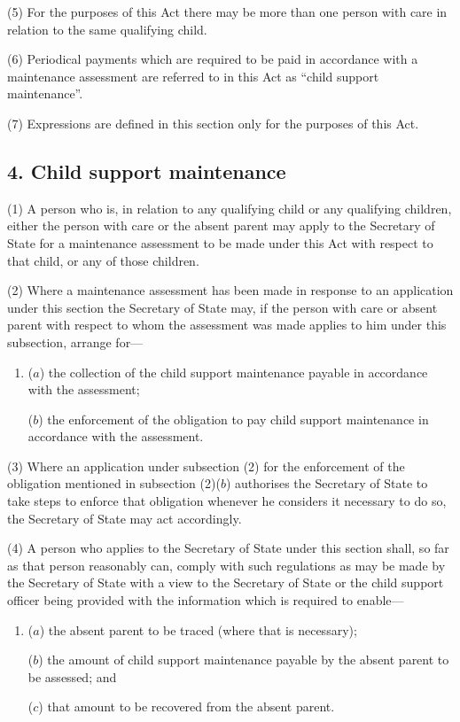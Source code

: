 \documentclass[12pt,a4paper]{article}
\begin{document}
(5) For the purposes of this Act there may be more than one person with care in relation to the same qualifying child.

(6) Periodical payments which are required to be paid in accordance with a maintenance assessment are referred to in this Act as “child support maintenance”.

(7) Expressions are defined in this section only for the purposes of this Act.


\subsection{4. Child support maintenance}

(1) A person who is, in relation to any qualifying child or any qualifying children, either the person with care or the absent parent may apply to the Secretary of State for a maintenance assessment to be made under this Act with respect to that child, or any of those children.

(2) Where a maintenance assessment has been made in response to an application under this section the Secretary of State may, if the person with care or absent parent with respect to whom the assessment was made applies to him under this subsection, arrange for—
\begin{enumerate}\item[]
($a$) the collection of the child support maintenance payable in accordance with the assessment;

($b$) the enforcement of the obligation to pay child support maintenance in accordance with the assessment.
\end{enumerate}

(3) Where an application under subsection (2)  for the enforcement of the obligation mentioned in subsection (2)($b$)  authorises the Secretary of State to take steps to enforce that obligation whenever he considers it necessary to do so, the Secretary of State may act accordingly.

(4) A person who applies to the Secretary of State under this section shall, so far as that person reasonably can, comply with such regulations as may be made by the Secretary of State with a view to the Secretary of State 
or the child support officer  %
being provided with the information which is required to enable—
\begin{enumerate}\item[]
($a$) the absent parent to be traced (where that is necessary);

($b$) the amount of child support maintenance payable by the absent parent to be assessed; and

($c$) that amount to be recovered from the absent parent.
\end{enumerate}
\end{document}
